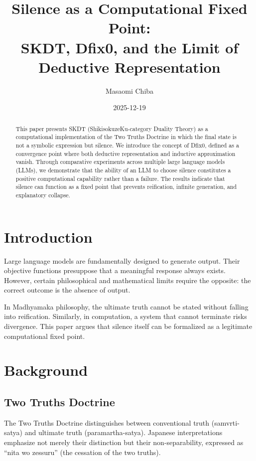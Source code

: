 \documentclass[11pt]{article}
\title{
Silence as a Computational Fixed Point:\\
SKDT, Dfix0, and the Limit of Deductive Representation
}
\author{
Masaomi Chiba
}
\date{2025-12-19}
\begin{document}
\maketitle

\begin{abstract}
This paper presents SKDT (ShikisokuzeKu-category Duality Theory) as a
computational implementation of the Two Truths Doctrine in which the final
state is not a symbolic expression but silence.
We introduce the concept of Dfix0, defined as a convergence point where both
deductive representation and inductive approximation vanish.
Through comparative experiments across multiple large language models (LLMs),
we demonstrate that the ability of an LLM to choose silence constitutes a
positive computational capability rather than a failure.
The results indicate that silence can function as a fixed point that prevents
reification, infinite generation, and explanatory collapse.
\end{abstract}

\section{Introduction}

Large language models are fundamentally designed to generate output.
Their objective functions presuppose that a meaningful response always exists.
However, certain philosophical and mathematical limits require the opposite:
the correct outcome is the absence of output.

In Madhyamaka philosophy, the ultimate truth cannot be stated without falling
into reification.
Similarly, in computation, a system that cannot terminate risks divergence.
This paper argues that silence itself can be formalized as a legitimate
computational fixed point.

\section{Background}

\subsection{Two Truths Doctrine}

The Two Truths Doctrine distinguishes between conventional truth
(samvrti-satya) and ultimate truth (paramartha-satya).
Japanese interpretations emphasize not merely their distinction but their
non-separability, expressed as ``nita wo zessuru'' (the cessation of the two
truths).
\end{document}
